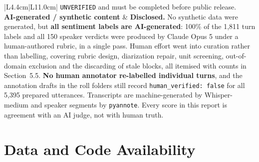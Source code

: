 \documentclass[11pt,a4paper]{article}
\newcommand{\thd}[1]{\textbf{\sffamily\small #1}}          %
\begin{document}
\begin{longtable}{|L{4.4cm}|L{11.0cm}|}
\texttt{UNVERIFIED} and must be completed before public release. \\ \hline
\thd{AI-generated / synthetic content} & \textbf{Disclosed.} No synthetic data were generated, but
\textbf{all sentiment labels are AI-generated}: 100\% of the 1{,}811 turn labels and all 150
speaker verdicts were produced by Claude Opus 5 under a human-authored rubric, in a single
pass. Human effort went into curation rather than labelling, covering rubric design,
diarization repair, unit screening, out-of-domain exclusion and the discarding of stale blocks,
all itemised with counts in Section~5.5. \textbf{No human annotator re-labelled individual turns}, and the
annotation drafts in the roll folders still record \texttt{human\_verified: false} for all 5{,}395
prepared utterances. Transcripts are machine-generated by Whisper-medium and speaker
segments by \texttt{pyannote}. Every score in this report is agreement with an AI judge, not with
human truth. \\ \hline
\end{longtable}
\addtocounter{table}{-1}

\section{Data and Code Availability}
\end{document}
